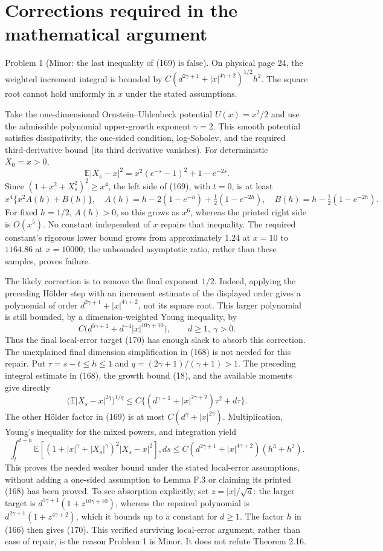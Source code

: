 \documentclass[10pt]{article}
\begin{document}
\section*{Corrections required in the mathematical argument}
Problem 1 (Minor: the last inequality of (169) is false).  On physical page 24, the weighted increment integral is bounded by \(C(d^{2\gamma+1}+|x|^{4\gamma+2})^{1/2}h^2\). The square root cannot hold uniformly in \(x\) under the stated assumptions.\par
Take the one-dimensional Ornstein–Uhlenbeck potential \(U(x)=x^2/2\) and use the admissible polynomial upper-growth exponent \(\gamma=2\). This smooth potential satisfies dissipativity, the one-sided condition, log-Sobolev, and the required third-derivative bound (its third derivative vanishes). For deterministic \(X_0=x>0\), \[\mathbb E|X_s-x|^2=x^2(e^{-s}-1)^2+1-e^{-2s}.\] Since \((1+x^2+X_s^2)^2\ge x^4\), the left side of (169), with \(t=0\), is at least \[x^4\{x^2 A(h)+B(h)\},\quad
 A(h)=h-2(1-e^{-h})+\tfrac12(1-e^{-2h}),\quad
 B(h)=h-\tfrac12(1-e^{-2h}).\] For fixed \(h=1/2\), \(A(h)>0\), so this grows as \(x^6\), whereas the printed right side is \(O(x^5)\). No constant independent of \(x\) repairs that inequality. The required constant’s rigorous lower bound grows from approximately \(1.24\) at \(x=10\) to \(1164.86\) at \(x=10000\); the unbounded asymptotic ratio, rather than these samples, proves failure.\par
The likely correction is to remove the final exponent \(1/2\). Indeed, applying the preceding Hölder step with an increment estimate of the displayed order gives a polynomial of order \(d^{2\gamma+1}+|x|^{4\gamma+2}\), not its square root. This larger polynomial is still bounded, by a dimension-weighted Young inequality, by \[C\bigl(d^{5\gamma+1}+d^{-4}|x|^{10\gamma+10}\bigr),\qquad d\ge1,\ \gamma>0.\] Thus the final local-error target (170) has enough slack to absorb this correction. The unexplained final dimension simplification in (168) is not needed for this repair. Put \(\tau=s-t\le h\le1\) and \(q=(2\gamma+1)/(\gamma+1)>1\). The preceding integral estimate in (168), the growth bound (18), and the available moments give directly \[\bigl(\mathbb E|X_s-x|^{2q}\bigr)^{1/q}
 \le C\{(d^{\gamma+1}+|x|^{2\gamma+2})\tau^2+d\tau\}.\] The other Hölder factor in (169) is at most \(C(d^\gamma+|x|^{2\gamma})\). Multiplication, Young’s inequality for the mixed powers, and integration yield \[\int_t^{t+h}\mathbb E[(1+|x|^\gamma+|X_s|^\gamma)^2|X_s-x|^2],ds
 \le C(d^{2\gamma+1}+|x|^{4\gamma+2})(h^3+h^2).\] This proves the needed weaker bound under the stated local-error assumptions, without adding a one-sided assumption to Lemma F.3 or claiming its printed (168) has been proved. To see absorption explicitly, set \(z=|x|/\sqrt d\): the larger target is \(d^{5\gamma+1}(1+z^{10\gamma+10})\), whereas the repaired polynomial is \(d^{2\gamma+1}(1+z^{4\gamma+2})\), which it bounds up to a constant for \(d\ge1\). The factor \(h\) in (166) then gives (170). This verified surviving local-error argument, rather than ease of repair, is the reason Problem 1 is Minor. It does not refute Theorem 2.16.\par
\end{document}
